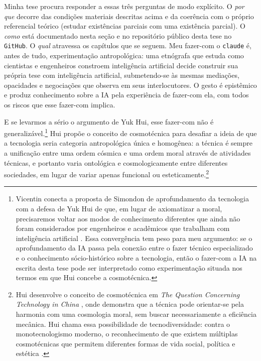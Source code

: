 Minha tese procura responder a essas três perguntas de modo explícito. O \textit{por que} decorre das condições materiais descritas acima e da coerência com o próprio referencial teórico (estudar existências parciais com uma existência parcial). O \textit{como} está documentado nesta seção e no repositório público desta tese no \texttt{GitHub}. O \textit{qual} atravessa os capítulos que se seguem. Meu fazer-com o \texttt{claude} é, antes de tudo, experimentação antropológica: uma etnógrafa que estuda como cientistas e engenheiros constroem inteligência artificial decide construir sua própria tese com inteligência artificial, submetendo-se às mesmas mediações, opacidades e negociações que observa em seus interlocutores. O gesto é epistêmico e produz conhecimento sobre a IA pela experiência de fazer-com ela, com todos os riscos que esse fazer-com implica.

E se levarmos a sério o argumento de Yuk Hui, esse fazer-com não é generalizável.\footnote{Vicentin conecta a proposta de Simondon de aprofundamento da tecnologia com a defesa de Yuk Hui de que, em lugar de axiomatizar a moral, precisaremos voltar aos modos de conhecimento diferentes que ainda não foram considerados por engenheiros e acadêmicos que trabalham com inteligência artificial \parencite[p.~186]{hui2020tecnodiversidade}. Essa convergência tem peso para meu argumento: se o aprofundamento da IA passa pela conexão entre o fazer técnico especializado e o conhecimento sócio-histórico sobre a tecnologia, então o fazer-com a IA na escrita desta tese pode ser interpretado como experimentação situada nos termos em que Hui concebe a cosmotécnica.} Hui propõe o conceito de cosmotécnica para desafiar a ideia de que a tecnologia seria categoria antropológica única e homogênea: a técnica é sempre a unificação entre uma ordem cósmica e uma ordem moral através de atividades técnicas, e portanto varia ontológica e cosmologicamente entre diferentes sociedades, em lugar de variar apenas funcional ou esteticamente.\footnote{Hui desenvolve o conceito de cosmotécnica em \textit{The Question Concerning Technology in China} \parencite{hui2016china}, onde demonstra que a técnica pode orientar-se pela harmonia com uma cosmologia moral, sem buscar necessariamente a eficiência mecânica. Hui chama essa possibilidade de tecnodiversidade: contra o monotecnologismo moderno, o reconhecimento de que existem múltiplas cosmotécnicas que permitem diferentes formas de vida social, política e estética \parencite{hui2020tecnodiversidade}.}

